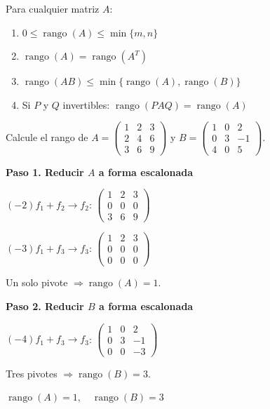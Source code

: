 \begin{theorem}\label{thm:rango-prop}
Para cualquier matriz \( A \):
\begin{enumerate}
\item \( 0 \leq \operatorname{rango}(A) \leq \min\{m, n\} \)
\item \( \operatorname{rango}(A) = \operatorname{rango}(A^T) \)
\item \( \operatorname{rango}(AB) \leq \min\{\operatorname{rango}(A), \operatorname{rango}(B)\} \)
\item Si \( P \) y \( Q \) invertibles: \( \operatorname{rango}(PAQ) = \operatorname{rango}(A) \)
\end{enumerate}
\end{theorem}

\begin{example}
Calcule el rango de \( A = \begin{pmatrix}
1 & 2 & 3 \\
2 & 4 & 6 \\
3 & 6 & 9
\end{pmatrix} \) y \( B = \begin{pmatrix}
1 & 0 & 2 \\
0 & 3 & -1 \\
4 & 0 & 5
\end{pmatrix} \).
\begin{myproof}
\textbf{Paso 1. Reducir $A$ a forma escalonada}

$(-2)f_1 + f_2 \to f_2$: $\begin{pmatrix} 1 & 2 & 3 \\ 0 & 0 & 0 \\ 3 & 6 & 9 \end{pmatrix}$

$(-3)f_1 + f_3 \to f_3$: $\begin{pmatrix} \boxed{1} & 2 & 3 \\ 0 & 0 & 0 \\ 0 & 0 & 0 \end{pmatrix}$

Un solo pivote $\Rightarrow \operatorname{rango}(A) = 1$.

\textbf{Paso 2. Reducir $B$ a forma escalonada}

$(-4)f_1 + f_3 \to f_3$: $\begin{pmatrix} \boxed{1} & 0 & 2 \\ 0 & \boxed{3} & -1 \\ 0 & 0 & \boxed{-3} \end{pmatrix}$

Tres pivotes $\Rightarrow \operatorname{rango}(B) = 3$.

$\boxed{\operatorname{rango}(A) = 1, \quad \operatorname{rango}(B) = 3}$
\end{myproof}
\end{example}

